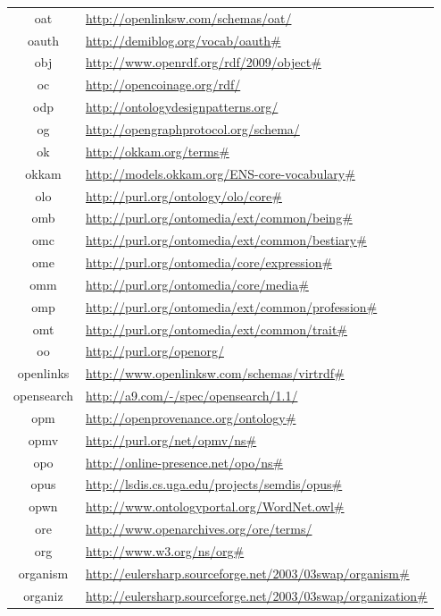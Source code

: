 \documentclass{article}
\begin{document}
\begin{longtable}{ c | p{8cm} }
		oat & \url{http://openlinksw.com/schemas/oat/} \\
		oauth & \url{http://demiblog.org/vocab/oauth#} \\
		obj & \url{http://www.openrdf.org/rdf/2009/object#} \\
		oc & \url{http://opencoinage.org/rdf/} \\
		odp & \url{http://ontologydesignpatterns.org/} \\
		og & \url{http://opengraphprotocol.org/schema/} \\
		ok & \url{http://okkam.org/terms#} \\
		okkam & \url{http://models.okkam.org/ENS-core-vocabulary#} \\
		olo & \url{http://purl.org/ontology/olo/core#} \\
		omb & \url{http://purl.org/ontomedia/ext/common/being#} \\
		omc & \url{http://purl.org/ontomedia/ext/common/bestiary#} \\
		ome & \url{http://purl.org/ontomedia/core/expression#} \\
		omm & \url{http://purl.org/ontomedia/core/media#} \\
		omp & \url{http://purl.org/ontomedia/ext/common/profession#} \\
		omt & \url{http://purl.org/ontomedia/ext/common/trait#} \\
		oo & \url{http://purl.org/openorg/} \\
		openlinks & \url{http://www.openlinksw.com/schemas/virtrdf#} \\
		opensearch & \url{http://a9.com/-/spec/opensearch/1.1/} \\
		opm & \url{http://openprovenance.org/ontology#} \\
		opmv & \url{http://purl.org/net/opmv/ns#} \\
		opo & \url{http://online-presence.net/opo/ns#} \\
		opus & \url{http://lsdis.cs.uga.edu/projects/semdis/opus#} \\
		opwn & \url{http://www.ontologyportal.org/WordNet.owl#} \\
		ore & \url{http://www.openarchives.org/ore/terms/} \\
		org & \url{http://www.w3.org/ns/org#} \\
		organism & \url{http://eulersharp.sourceforge.net/2003/03swap/organism#} \\
		organiz & \url{http://eulersharp.sourceforge.net/2003/03swap/organization#} \\

\end{longtable}
\end{document}
